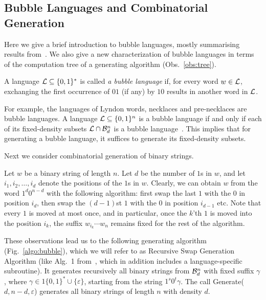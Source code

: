 \documentclass[11pt,a4paper]{llncs}
\renewcommand{\epsilon}{\varepsilon}
\begin{document}
\subsection{Bubble Languages and Combinatorial Generation}

Here we give a brief introduction to bubble languages, mostly summarising results from~\cite{RSW12,SW12}. We also give a new characterization of bubble languages in terms of the computation tree of a generating algorithm (Obs.~\ref{obs:tree}).

\begin{definition}
A language ${\cal L} \subseteq \{0,1\}^*$ is called {\em a bubble language} if, for every word $w\in {\cal L}$, exchanging the first occurrence of $01$ (if any) by $10$ results in another word in ${\cal L}$. 
\end{definition}



For example, the languages of Lyndon words, necklaces and pre-necklaces are bubble languages. 
A language ${\cal L}\subseteq \{0,1\}^n$ is a bubble language if and only if each of its fixed-density subsets ${\cal L} \cap {\mathcal B}^n_d$ is a bubble language~\cite{RSW12}. This implies that for generating a bubble language, it suffices to generate its fixed-density subsets.

Next we consider combinatorial generation of binary strings.

Let $w$ be a binary string of length $n$. Let $d$ be the number of $1$s in $w$, and let $i_1,i_2,\ldots, i_d$ denote the positions of the $1$s in $w$. 
Clearly, we can obtain $w$ from the word $1^d0^{n-d}$ with the following algorithm: first swap the last $1$ with the $0$ in position $i_d$, then swap the $(d-1)$st $1$ with the $0$ in position $i_{d-1}$ etc. Note that every $1$ is moved at most once, and in particular, once the $k$'th $1$ is moved into the position $i_k$, the suffix $w_{i_k}\cdots w_n$ remains fixed for the rest of the algorithm. 

These observations lead us to the following generating algorithm (Fig.~\ref{algo:bubble}), which we will refer to as Recursive Swap Generation Algorithm (like Alg.\ 1 from~\cite{SW12}, which in addition includes a language-specific subroutine). It generates recursively all binary strings from ${\cal B}^n_d$ with fixed suffix $\gamma$, 
where $\gamma\in 1\{0,1\}^* \cup \{\epsilon\}$, starting from the string $1^s0^t\gamma$. The call Generate($d,n-d,\epsilon$) generates all binary strings of length $n$ with density $d$.  
\end{document}
